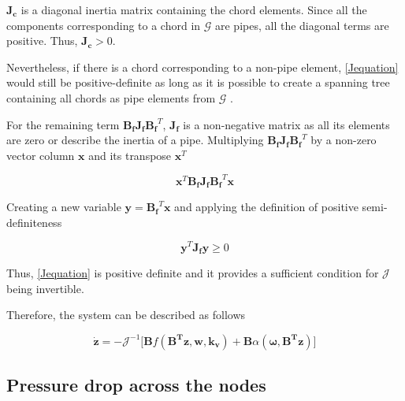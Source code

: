 $\bm{J_c}$ is a diagonal inertia matrix containing the chord elements. Since all the components corresponding to a chord in $\bm{\mathcal{G}}$ are pipes, all the 
diagonal terms are positive. Thus, $\bm{J_c} > 0$. 

Nevertheless, if there is a chord corresponding to a non-pipe element, \eqref{Jequation} 
would still be positive-definite as long as it is possible to create a spanning tree containing all chords as pipe elements from $\bm{\mathcal{G}}$ \cite{TowerModel}.

For the remaining term $\bm{B_f J_f {B_f}}^T$, $\bm{J_f}$ is a non-negative matrix as all its elements are zero or describe the inertia of a pipe. 
Multiplying $\bm{B_f J_f {B_f}}^T$ by a non-zero vector column $\mathbf{x}$ and its transpose $\mathbf{x}^{T}$

\begin{equation}
  \bm{x}^{T} \bm{B_f J_f {B_f}}^T \bm{x}
  \label{PosDefi}
\end{equation}

Creating a new variable $\bm{y} = \bm{B_f}^T \mathbf{x}$ and applying the definition of positive semi-definiteness 
\cite{MatrixBook}

\begin{equation}
  \bm{y}^{T} \bm{J_f y} \geqslant 0
  \label{PosDefEq}
\end{equation}

Thus, \eqref{Jequation} is positive definite and it provides a sufficient condition for $\bm{\mathcal{J}}$ being invertible. 

Therefore, the system can be described as follows

\begin{equation}
   \bm{\dot{z}} = -\mathcal{J}^{-1} \Big[ \bm{B} f(\bm{B^T}\bm{z}, \bm{w}, \bm{k_v}) + \bm{B}\alpha (\bm{\omega},\bm{B^T}\bm{z}) \Big ]
   \label{ParatModelFinal}
 \end{equation}

\subsection{Pressure drop across the nodes}
\label{ModelRelationSection}



